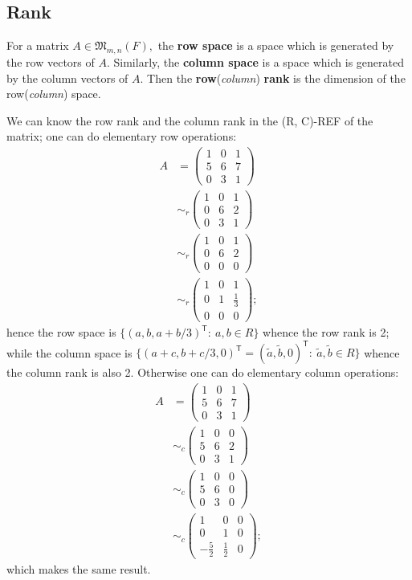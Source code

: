 \subsection{Rank}
\begin{defn}
For a matrix $A\in\mathfrak M_{m,n}(F),$ the \textbf{row space} is a space which is generated by the row vectors of $A.$ Similarly, the \textbf{column space} is a space which is generated by the column vectors of $A.$ Then the \textbf{row}(\textit{column}) \textbf{rank} is the dimension of the row(\textit{column}) space.
\end{defn}
\begin{ex}
We can know the row rank and the column rank in the (R, C)-REF of the matrix; one can do elementary row operations: \begin{align*}
A &= \begin{pmatrix}1&0&1\\5&6&7\\0&3&1\end{pmatrix}\\
&\sim_r \begin{pmatrix}1&0&1\\0&6&2\\0&3&1\end{pmatrix}\\
&\sim_r \begin{pmatrix}1&0&1\\0&6&2\\0&0&0\end{pmatrix}\\
&\sim_r \begin{pmatrix}1&0&1\\0&1&\frac 1 3 \\0&0&0\end{pmatrix};
\end{align*}
hence the row space is $\{(a,b,a+b/3)^\mathsf T:~a,b\in R\}$ whence the row rank is 2; while the column space is $\{(a+c,b+c/3,0)^\mathsf T = (\tilde a,\tilde b,0)^\mathsf T:~\tilde a,\tilde b\in R\}$ whence the column rank is also 2. Otherwise one can do elementary column operations: \begin{align*}
A &= \begin{pmatrix}1&0&1\\5&6&7\\0&3&1\end{pmatrix}\\
&\sim_c \begin{pmatrix}1&0&0\\5&6&2\\0&3&1\end{pmatrix}\\
&\sim_c \begin{pmatrix}1&0&0\\5&6&0\\0&3&0\end{pmatrix}\\
&\sim_c \begin{pmatrix}1&0&0\\0&1&0\\-\frac 5 2&\frac1 2&0\end{pmatrix};
\end{align*}
which makes the same result.
\end{ex}

